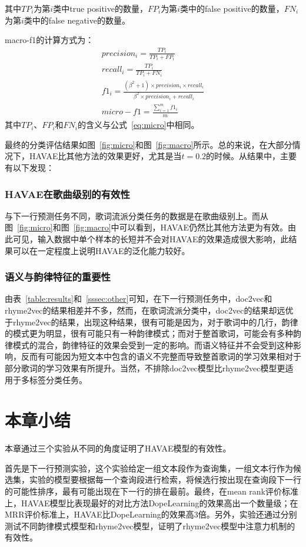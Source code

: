 其中$TP_i$为第$i$类中true positive的数量，$FP_i$为第$i$类中的false positive的数量，$FN_i$为第$i$类中的false negative的数量。\par
macro-f1的计算方式为：
\begin{equation}
  \begin{gathered}
    precision_i = \frac{TP_i}{TP_i + FP_i}\\
    recall_i = \frac{TP_i}{TP_i + FN_i}\\
    f1_i = \frac{(\beta^2 + 1) \times precision_{i} \times recall_{i}}{\beta^2 \times precision_{i} + recall_{i}}\\
    micro-f1 = \frac{\sum_{i=1}^mf1_i}{m}
  \end{gathered}
\end{equation}
其中$TP_i$、$FP_i$和$FN_i$的含义与公式~\ref{eq:micro}中相同。\par

最终的分类评估结果如图~\ref{fig:micro}和图~\ref{fig:macro}所示。总的来说，在大部分情况下，HAVAE比其他方法的效果更好，尤其是当$t=0.2$的时候。从结果中，主要有以下发现：
\subsubsection{HAVAE在歌曲级别的有效性} 与下一行预测任务不同，歌词流派分类任务的数据是在歌曲级别上。而从图~\ref{fig:micro}和图~\ref{fig:macro}中可以看到，HAVAE仍然比其他方法更为有效。由此可见，输入数据中单个样本的长短并不会对HAVAE的效果造成很大影响，此结果可以在一定程度上说明HAVAE的泛化能力较好。\par

\subsubsection{语义与韵律特征的重要性} 由表~\ref{table:results}和~\ref{sssec:other}可知，在下一行预测任务中，doc2vec和rhyme2vec的结果相差并不多，然而，在歌词流派分类中，doc2vec的结果却远优于rhyme2vec的结果，出现这种结果，很有可能是因为，对于歌词中的几行，韵律的模式更为明显，很有可能只有一种韵律模式；而对于整首歌词，可能会有多种韵律模式的混合，韵律特征的效果会受到一定的影响。而语义特征并不会受到这种影响，反而有可能因为短文本中包含的语义不完整而导致整首歌词的学习效果相对于部分歌词的学习效果有所提升。当然，不排除doc2vec模型比rhyme2vec模型更适用于多标签分类任务。\par

\section{本章小结}
本章通过三个实验从不同的角度证明了HAVAE模型的有效性。\par
首先是下一行预测实验，这个实验给定一组文本段作为查询集，一组文本行作为候选集，实验的模型要根据每一个查询段进行检索，将候选行按出现在查询段下一行的可能性排序，最有可能出现在下一行的排在最前。最终，在mean rank评价标准上，HAVAE模型比表现最好的对比方法DopeLearning的效果高出一个数量级；在MRR评价标准上，HAVAE比DopeLearning的效果高3倍。另外，实验还通过分别测试不同韵律模式模型和rhyme2vec模型，证明了rhyme2vec模型中注意力机制的有效性。\par

